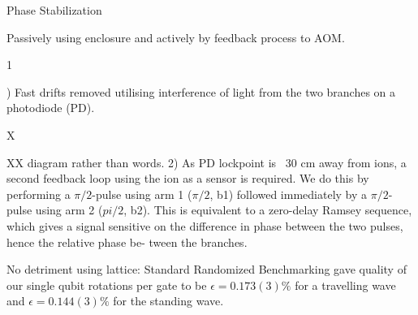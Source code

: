 \documentclass[final]{beamer}
\newcommand{\SubItem}[1]{
    {\setlength\itemindent{15pt} \item[] #1}
}
\begin{document}
\begin{frame}{}
\begin{center}
\begin{columns}[t]
\begin{column}{0.49\textwidth}
\begin{alertblock}{Phase Stabilization}
      \begin{itemize}
      \item Passively using enclosure and actively by feedback process to AOM.\\
      \SubItem 1) Fast drifts removed utilising interference of light
            from the two branches on a photodiode (PD).\\

      \SubItem XXX diagram rather than words. 2) As PD lockpoint is ~30 cm away
            from ions, a second feedback loop using the ion as a
            sensor is required. We do this by performing a $\pi/2$-pulse
            using arm 1 ($\pi/2$, b1) followed immediately by a $\pi/2$-pulse
            using arm 2 ($pi/2$, b2). This is equivalent to a zero-delay
            Ramsey sequence, which gives a signal sensitive on the
            difference in phase between the two pulses, hence the
            relative phase be- tween the branches.\\

      \item No detriment using lattice: Standard Randomized
            Benchmarking gave quality of our single qubit rotations per
            gate to be $\epsilon = 0.173(3)\%$ for a travelling wave and
            $\epsilon = 0.144(3)\%$ for the standing wave.\\
      \end{itemize}
    \end{alertblock}


\end{column}
\end{columns}
\end{center}
\end{frame}
\end{document}

